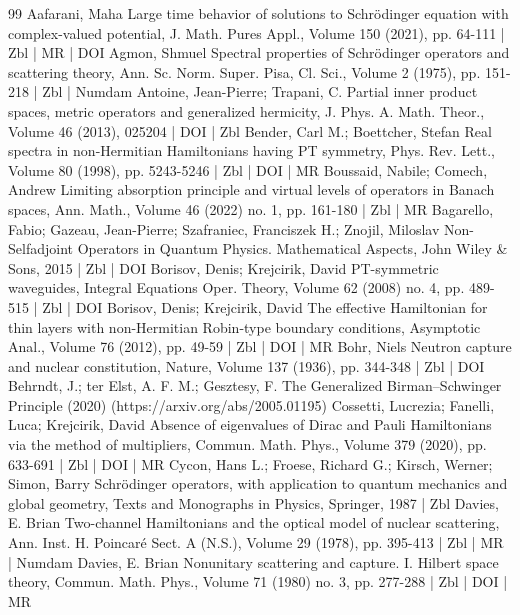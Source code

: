 \documentclass[10pt]{amsart}
\theoremstyle{definition}\newtheorem{defi}[theo]{Definition}\newtheorem{rema}[theo]{Remark}\newtheorem{exam}[theo]{Example}\newtheorem{exem}[theo]{Example}\newtheorem{nota}[theo]{Notation}
\begin{document}
\begin{thebibliography}{99}
Aafarani, Maha Large time behavior of solutions to Schrödinger equation with complex-valued potential, J. Math. Pures Appl., Volume 150 (2021), pp. 64-111 | Zbl | MR | DOI
Agmon, Shmuel Spectral properties of Schrödinger operators and scattering theory, Ann. Sc. Norm. Super. Pisa, Cl. Sci., Volume 2 (1975), pp. 151-218 | Zbl | Numdam
Antoine, Jean-Pierre; Trapani, C. Partial inner product spaces, metric operators and generalized hermicity, J. Phys. A. Math. Theor., Volume 46 (2013), 025204 | DOI | Zbl
Bender, Carl M.; Boettcher, Stefan Real spectra in non-Hermitian Hamiltonians having PT symmetry, Phys. Rev. Lett., Volume 80 (1998), pp. 5243-5246 | Zbl | DOI | MR
Boussaid, Nabile; Comech, Andrew Limiting absorption principle and virtual levels of operators in Banach spaces, Ann. Math., Volume 46 (2022) no. 1, pp. 161-180 | Zbl | MR
Bagarello, Fabio; Gazeau, Jean-Pierre; Szafraniec, Franciszek H.; Znojil, Miloslav Non-Selfadjoint Operators in Quantum Physics. Mathematical Aspects, John Wiley \& Sons, 2015 | Zbl | DOI
Borisov, Denis; Krejcirik, David PT-symmetric waveguides, Integral Equations Oper. Theory, Volume 62 (2008) no. 4, pp. 489-515 | Zbl | DOI
Borisov, Denis; Krejcirik, David The effective Hamiltonian for thin layers with non-Hermitian Robin-type boundary conditions, Asymptotic Anal., Volume 76 (2012), pp. 49-59 | Zbl | DOI | MR
Bohr, Niels Neutron capture and nuclear constitution, Nature, Volume 137 (1936), pp. 344-348 | Zbl | DOI
Behrndt, J.; ter Elst, A. F. M.; Gesztesy, F. The Generalized Birman–Schwinger Principle (2020) (https://arxiv.org/abs/2005.01195)
Cossetti, Lucrezia; Fanelli, Luca; Krejcirik, David Absence of eigenvalues of Dirac and Pauli Hamiltonians via the method of multipliers, Commun. Math. Phys., Volume 379 (2020), pp. 633-691 | Zbl | DOI | MR
Cycon, Hans L.; Froese, Richard G.; Kirsch, Werner; Simon, Barry Schrödinger operators, with application to quantum mechanics and global geometry, Texts and Monographs in Physics, Springer, 1987 | Zbl
Davies, E. Brian Two-channel Hamiltonians and the optical model of nuclear scattering, Ann. Inst. H. Poincaré Sect. A (N.S.), Volume 29 (1978), pp. 395-413 | Zbl | MR | Numdam
Davies, E. Brian Nonunitary scattering and capture. I. Hilbert space theory, Commun. Math. Phys., Volume 71 (1980) no. 3, pp. 277-288 | Zbl | DOI | MR

\end{thebibliography}
\end{document}
